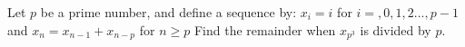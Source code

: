 Let $p$ be a prime number, and define a sequence by: $x_i=i$ for $i=,0,1,2...,p-1$ and $x_n=x_{n-1}+x_{n-p}$ for $n \geq p$
Find the remainder when $x_{p^3}$ is divided by $p$.